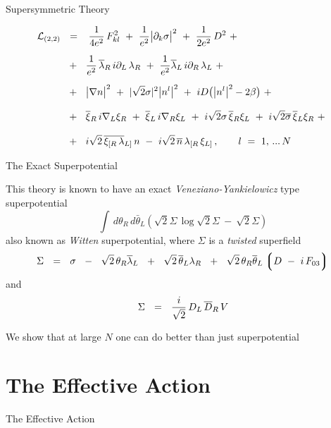 \documentclass{beamer}
\begin{document}
\begin{frame}{\ntwot Supersymmetric Theory}

\begin{align}
% 
\notag
 	\mc{L}_\text{(2,2)} & ~~=~~
	\,\frac{1}{4e^2}\,F_{kl}^2  ~+~ \frac{1}{e^2} \big|\p_k \sigma\big|^2 
	~+~ \frac{1}{2e^2}\, D^2 ~+~
	\\[2mm]
%
\notag
	&
	~~+~~
	\frac{1}{e^2}\, \blar\, i\p_L\, \lar  ~+~  \frac{1}{e^2} \blal\, i\p_R\, \lal
	~+~
	\\[2mm]
%
\notag
	&
	~~+~~
	\big| \nabla n \big|^2  ~+~ | \sqrt{2}\sigma |^2 \big| n^l \big|^2
	~+~ iD \big( \big|n^l \big|^2 - 2\beta \big)
	~+~
	\\[2.8mm]
%
\notag	&
	~~+~~ \bxir\, i\nabla_L \xir  ~+~ \bxil\, i\nabla_R \xil ~+~
	i\sqrt{2}\sigma\, \bxir \xil
	~+~ i\sqrt{2}\ov{\sigma}\, \bxil \xir
	~+~
	\\[2.8mm]
%
\notag
	&
	~~+~~ i\sqrt{2}\, \ov{\xi_{[R}\, \lambda}{}_{L]}\, n
	~-~ i\sqrt{2}\, \nbar\,  \lambda_{[R}\, \xi_{L]}\,,
	\qquad
	l  ~=~  1,\,...\,N
\end{align}

\end{frame}


\begin{frame}{The Exact Superpotential}
	
	This theory is known to have an exact {\it Veneziano-Yankielowicz} type
	superpotential
\[
	\int\, 	d\theta_R\, d\bar\theta_L \left( \sqrt{2}\Sigma\, \log \sqrt{2}\Sigma ~-~  
					         \sqrt{2}\Sigma \right)
\]
	also known as {\it Witten} superpotential,
	where $ \Sigma $ is a {\it twisted} superfield
\[
	\Sigma     ~~=~~    \sigma  ~~-~~  \sqrt{2}\, \theta_R \overline\lambda{}_L
				    ~~+~~  \sqrt{2}\, \overline\theta{}_L \lambda_R
				    ~~+~~  \sqrt{2}\, \theta_R \overline\theta{}_L \left\lgroup D ~-~ i\, F_{03} \right\rgroup
\]	
	and
\[
	\Sigma    ~~=~~    \frac{i}{\sqrt 2}\, D_L\, \overline D{}_R\, V
\]

	We show that at large $ N $ one can do better than just superpotential

\end{frame}




\section{The Effective Action}
\begin{frame}{}
\fontsize{60pt}{60pt}\selectfont
\begin{center}
        The Effective Action
\end{center}
\end{frame}
\end{document}

